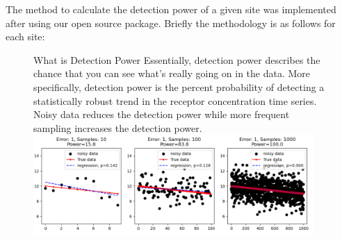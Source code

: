 The method to calculate the detection power of a given site was implemented after \citet{dumont_determining_nodate}
using our open source package\citep{dumont_komanawagw_detect_power_2023}.
Briefly the methodology is as follows for each site:

\begin{figure}
    \begin{breakawaybox}[label={box:dp}]{What is Detection Power}
        Essentially, detection power describes the chance that you can see what's really going on in the data.
        More specifically, detection power is the percent probability of detecting a statistically robust trend in the receptor concentration time series.
        Noisy data reduces the detection power while more frequent sampling increases the detection power.
        \\
        \includegraphics[width=0.95\textwidth]{figures/dp_ex}
    \end{breakawaybox}
\end{figure}

